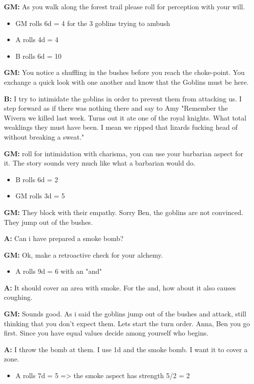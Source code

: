 \documentclass[11pt]{article}
\begin{document}
{\textbf{GM:} As you walk along the forest trail please roll for perception with your will.
\begin{itemize}
\item GM rolls 6d = 4 for the 3 goblins trying to ambush
\item A rolls 4d =  4
\item B rolls 6d = 10
\end{itemize}

\textbf{GM:} You notice a shuffling in the bushes before you reach the choke-point. You exchange a quick look with one another and know that the Goblins must be here. 

\textbf{B:} I try to intimidate the goblins in order to prevent them from attacking us. I step forward as if there was nothing there and say to Amy "Remember the Wivern we killed last week. Turns out it ate one of the royal knights. What total weaklings they must have been. I mean we ripped that lizards fucking head of without breaking a sweat."

\textbf{GM:} roll for intimidation with charisma, you can use your barbarian aspect for it. The story sounds very much like what a barbarian would do.
\begin{itemize}
\item B rolls 6d = 2
\item GM rolls 3d = 5
\end{itemize}

\textbf{GM:} They block with their empathy. Sorry Ben, the goblins are not convinced. They jump out of the bushes.

\textbf{A:} Can i have prepared a smoke bomb?

\textbf{GM:} Ok, make a retroactive check for your alchemy.
\begin{itemize}
\item A rolls 9d = 6 with an "and"
\end{itemize}

\textbf{A:} It should cover an area with smoke. For the and, how about it also causes coughing.

\textbf{GM:} Sounds good. As i said the goblins jump out of the bushes and attack, still thinking that you don't expect them. Lets start the turn order. Anna, Ben you go first. Since you have equal values decide among yourself who begins.

\textbf{A:} I throw the bomb at them. I use 1d and the smoke bomb. I want it to cover a zone.
\begin{itemize}
\item A rolls 7d = 5 => the smoke aspect has strength 5/2 = 2
\end{itemize}

}
\end{document}
